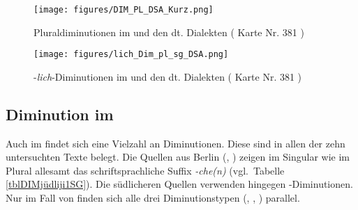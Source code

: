    
 
 
  
 


  \begin{figure} 

\texttt{[image: figures/DIM\_PL\_DSA\_Kurz.png]}
		\caption{\label{DimDSALiJi} Pluraldiminutionen im  und den dt. Dialekten ( Karte Nr. 381 )}
		\end{figure}  
 



\begin{figure} 

\texttt{[image: figures/lich\_Dim\_pl\_sg\_DSA.png]}
		\caption{\label{DimDSALiJilich} -\textit{lich}-Diminutionen im  und den dt. Dialekten ( Karte Nr. 381 )}
		\end{figure}
  
\newpage 
\subsection{Diminution im  }\label{DIMjüdLiJi1}
Auch im  findet sich eine Vielzahl an Diminutionen. Diese sind in allen der zehn untersuchten Texte belegt. Die Quellen aus Berlin (, ) zeigen im Singular wie im Plural allesamt das schriftsprachliche Suffix \textit{-che(n)} (vgl.\, Tabelle \ref{tblDIMjüdliji1SG}). Die südlicheren Quellen verwenden hingegen -Diminutionen. Nur im Fall von  finden sich alle drei Diminutionstypen (, , ) parallel. 


